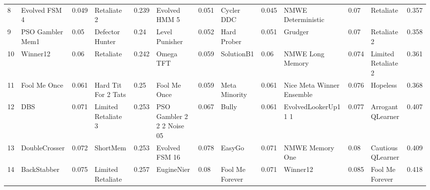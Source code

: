 \begin{tabular}{lllllllllllll}
8  &            Evolved FSM 4 &     0.049 &            Retaliate 2 &     0.239 &               Evolved HMM 5 &     0.051 &         Cycler DDC &     0.045 &         NMWE Deterministic &      0.07 &            Retaliate &     0.357 \\
9  &         PSO Gambler Mem1 &      0.05 &        Defector Hunter &      0.24 &              Level Punisher &     0.052 &        Hard Prober &     0.051 &                    Grudger &      0.07 &          Retaliate 2 &     0.358 \\
10 &                 Winner12 &      0.06 &              Retaliate &     0.242 &                   Omega TFT &     0.059 &         SolutionB1 &      0.06 &           NMWE Long Memory &     0.074 &  Limited Retaliate 2 &     0.361 \\
11 &             Fool Me Once &     0.061 &    Hard Tit For 2 Tats &      0.25 &                Fool Me Once &     0.059 &      Meta Minority &     0.061 &  Nice Meta Winner Ensemble &     0.076 &             Hopeless &     0.368 \\
12 &                      DBS &     0.071 &    Limited Retaliate 3 &     0.253 &  PSO Gambler 2 2 2 Noise 05 &     0.067 &              Bully &     0.061 &       EvolvedLookerUp1 1 1 &     0.077 &    Arrogant QLearner &     0.407 \\
13 &            DoubleCrosser &     0.072 &               ShortMem &     0.253 &              Evolved FSM 16 &     0.078 &             EasyGo &     0.071 &            NMWE Memory One &      0.08 &    Cautious QLearner &     0.409 \\
14 &              BackStabber &     0.075 &      Limited Retaliate &     0.257 &                  EugineNier &      0.08 &    Fool Me Forever &     0.071 &                   Winner12 &     0.085 &      Fool Me Forever &     0.418 \\
\bottomrule
\end{tabular}
